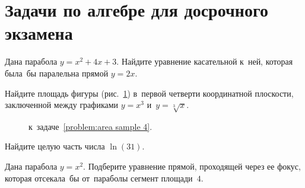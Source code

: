 \section*{Задачи по алгебре для досрочного экзамена}

\begin{problems}

\item
Дана парабола $y = x^2 + 4 x + 3$.
Найдите уравнение касательной к~ней, которая была~бы паралельна
прямой $y = 2 x$.

\item\label{problem:area sample 4}%
Найдите площадь фигуры (рис.~\ref{fig:area sample 4}) в~первой четверти
координатной плоскости, заключенной между графиками $y = x^3$
и~$y = \sqrt[3]{x}$.

\begin{figure}[ht]\begin{center}
    \caption{к~задаче~\ref{problem:area sample 4}.}
    \label{fig:area sample 4}
\end{center}\end{figure}

\item
Найдите целую часть числа $\ln(31)$.

\item
Дана парабола $y = x^2$.
Подберите уравнение прямой, проходящей через ее фокус, которая
отсекала~бы от~параболы сегмент площади~$4$.

\end{problems}

